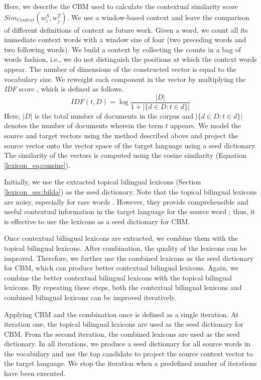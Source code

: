 \documentclass[english]{jnlp_1.4}
\begin{document}
Here, we describe the CBM used to calculate
the contextual similarity score 
\linebreak
$Sim_{Context}(w_i^S,w_j^T)$.
We use a window-based context and leave the comparison of different
definitions of context as future work. Given a word, we count all its immediate
context words with a window size of four (two preceding words and two following words). We build a
context by collecting the counts in a bag of words
fashion, i.e., we do not distinguish the positions at which the context
words appear. The number of dimensions of the constructed vector is equal to the
vocabulary size. We reweight each component in the vector
by multiplying the {\it IDF} score
\cite{garera-callisonburch-yarowsky:2009:CoNLL}, which is defined as follows.
\begin{equation}
IDF(t, D)=\log\frac{|D|}{1+|\{d\in{D}:t\in{d}\}|}
\end{equation}
Here, $|D|$ is the total number of documents in the corpus and
$|\{d\in{D}:t\in{d}\}|$ denotes the number of documents wherein the term $t$
appears. We model the source and target vectors using the method
described above and project the source vector onto the vector space of
the target language using a seed dictionary. The similarity of the
vectors is computed using the cosine similarity (Equation \ref{lexicon_eq:consine}).

Initially, we use the extracted topical bilingual lexicons (Section
\ref{lexicon_sec:bilda}) as the seed dictionary. Note that the topical bilingual lexicons
are noisy, especially for rare words \cite{vulic-moens:2012:EACL2012}.
However, they provide
comprehensible and useful contextual information in the target
language for the source word \cite{vulic-desmet-moens:2011:ACL-HLT2011};
thus, it is effective to use the lexicons as a seed dictionary for CBM.

Once contextual bilingual lexicons are extracted, we
combine them with the topical bilingual lexicons. After combination, the
quality of the lexicons can be improved. Therefore, we further use
the combined lexicons as the seed dictionary for CBM, which
can produce better contextual bilingual lexicons. Again, we combine the
better contextual bilingual lexicons with the topical bilingual lexicons.
By repeating these steps, both the contextual bilingual lexicons and combined 
bilingual lexicons can be improved iteratively.

Applying CBM and the combination once is defined as a single iteration. 
At iteration one, the topical bilingual lexicons are used as the seed dictionary for CBM. 
From the second iteration, the combined lexicons are used as the seed dictionary. In all 
iterations, we produce a seed dictionary for all source words in the vocabulary and use 
the top candidate to project the source context vector to the target language. We stop 
the iteration when a predefined number of iterations have been executed.
\end{document}
